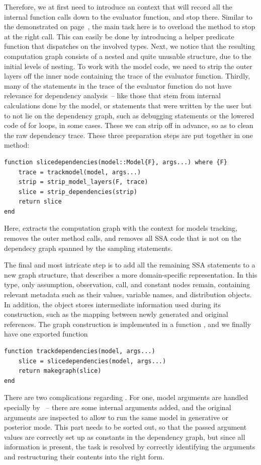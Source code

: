 Therefore, we at first need to introduce an \irtrackerjl{} context that will record all the internal
function calls down to the evaluator function, and stop there.  Similar to the
 demonstrated on page~\pageref{lst:depthlimitcontext}, the main task here
is to overload the  method to stop at the right call.  This can easily be done by
introducing a helper predicate function  that dispatches on the involved types.
Next, we notice that the resulting computation graph consists of a nested and quite unusable
structure, due to the initial levels of nesting.  To work with the model code, we need to strip the
outer layers off the inner node containing the trace of the evaluator function.  Thirdly, many of
the statements in the trace of the evaluator function do not have relevance for dependency
analysis~-- like those that stem from internal calculations done by the model, or statements that
were written by the user but to not lie on the dependency graph, such as debugging statements or the
lowered code of for loops, in some cases.  These we can strip off in advance, so as to clean the raw
dependency trace.  These three preparation steps are put together in one method:
\begin{lstlisting}
function slicedependencies(model::Model{F}, args...) where {F}
    trace = trackmodel(model, args...)
    strip = strip_model_layers(F, trace)
    slice = strip_dependencies(strip)
    return slice
end
\end{lstlisting}
Here,  extracts the computation graph with the context for models tracking,
 removes the outer method calls, and  removes
all SSA code that is not on the dependecy graph spanned by the sampling statements.

The final and most intricate step is to add all the remaining SSA statements to a new graph
structure, that describes a more domain-specific representation.  In this  type, only
assumption, observation, call, and constant nodes remain, containing relevant metadata such as their
values, variable names, and distribution objects.  In addition, the object stores intermediate
information used during its construction, such as the mapping between newly generated and original
references.  The graph construction is implemented in a function , and we finally
have one exported function
\begin{lstlisting}
function trackdependencies(model, args...)
    slice = slicedependencies(model, args...)
    return makegraph(slice)
end
\end{lstlisting}
There are two complications regarding .  For one, model arguments are handled
specially by \dppljl{}~-- there are some internal arguments added, and the original arguments are
inspected to allow to run the same model in generative or posterior mode.  This part needs to be
sorted out, so that the passed argument values are correctly set up as constants in the dependency
graph, but since all information is present, the task is resolved by correctly identifying the
arguments and restructuring their contents into the right form.


